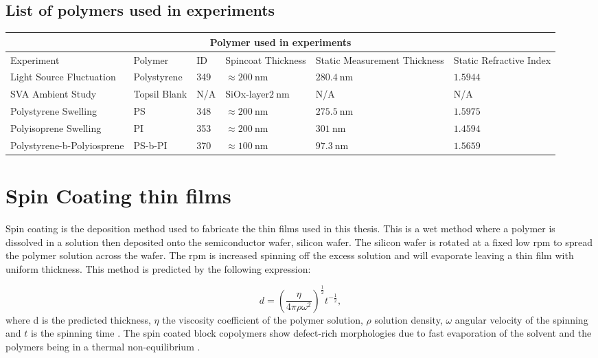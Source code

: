 \documentclass[MasterThesisMain.tex]{subfiles}
\begin{document}
\subsection{List of polymers used in experiments}

\begin{tabular}{ |p{3cm}||p{2cm}|p{2cm}|p{2cm}|p{2cm}|p{2cm}|  }
 \hline
 \multicolumn{6}{|c|}{Polymer used in experiments} \\
 \hline
 Experiment & Polymer & ID & Spincoat Thickness & Static Measurement Thickness & Static Refractive Index\\
 \hline
 Light Source Fluctuation & Polystyrene & 349 & $\approx\SI{200}{\nano\meter}$ & $\SI{280.4}{\nano\meter}$ & $1.5944$  \\
 SVA Ambient Study & Topsil Blank & N/A & SiOx-layer$\SI{2}{\nano\meter}$ & N/A & N/A  \\
 Polystyrene Swelling & PS  & 348  & $\approx\SI{200}{\nano\meter}$ & $\SI{275.5}{\nano\meter}$ & $1.5975$  \\
 Polyisoprene Swelling & PI  & 353 & $\approx\SI{200}{\nano\meter}$ & $\SI{301}{\nano\meter}$ & $1.4594$  \\
 Polystyrene-b-Polyiosprene & PS-b-PI & 370 & $\approx\SI{100}{\nano\meter}$ & $\SI{97.3}{\nano\meter}$ & $1.5659$  \\
 \hline
\end{tabular}

\section{Spin Coating thin films}
Spin coating is the deposition method used to fabricate the thin films used in this thesis. This is a wet method where a polymer is dissolved in a solution then deposited onto the semiconductor wafer, silicon wafer. The silicon wafer is rotated at a fixed low rpm to spread the polymer solution across the wafer. The rpm is increased spinning off the excess solution and will evaporate leaving a thin film with uniform thickness. This method is predicted by the following expression:

\begin{equation}
d = \left(\frac{\eta}{4\pi\rho\omega^2}\right)^{\frac{1}{2}} t^{-\frac{1}{2}},
\end{equation}  
where d is the predicted thickness, $\eta$ the viscosity coefficient of the polymer solution, $\rho$ solution density, $\omega$ angular velocity of the spinning and $t$ is the spinning time \cite{petty2008molecular}. The spin coated block copolymers show defect-rich morphologies due to fast evaporation of the solvent and the polymers being in a thermal non-equilibrium \cite{PosseltBCP}.
\end{document}
